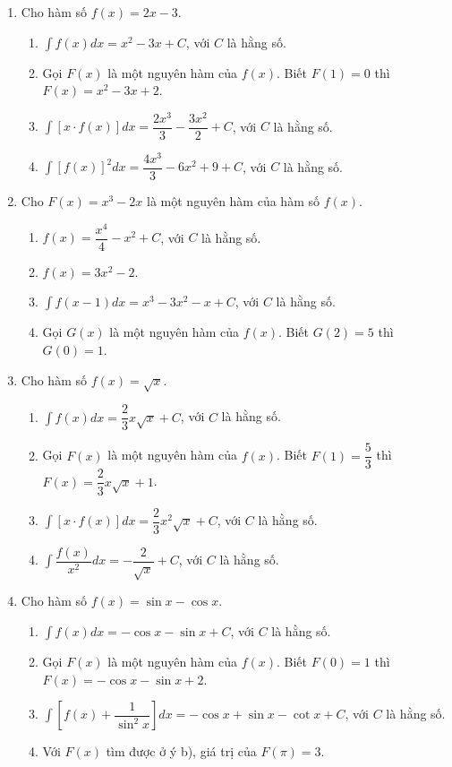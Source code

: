 \documentclass[12pt]{article}
\begin{document}
\begin{enumerate}[label=\textbf{Câu \arabic*.}, start=1]
		\item Cho hàm số $f(x) = 2x - 3$.
		\begin{enumerate}[label=\alph*)]
			\item $\displaystyle \int f(x) dx = x^2 - 3x + C$, với $C$ là hằng số.
			\item Gọi $F(x)$ là một nguyên hàm của $f(x)$. Biết $F(1) = 0$ thì $F(x) = x^2 - 3x + 2$.
			\item $\displaystyle \int [x \cdot f(x)] dx = \dfrac{2x^3}{3} - \dfrac{3x^2}{2} + C$, với $C$ là hằng số.
			\item $\displaystyle \int [f(x)]^2 dx = \dfrac{4x^3}{3} - 6x^2 + 9 + C$, với $C$ là hằng số.
		\end{enumerate}
		
		\item Cho $F(x) = x^3 - 2x$ là một nguyên hàm của hàm số $f(x)$.
		\begin{enumerate}[label=\alph*)]
			\item $f(x) = \dfrac{x^4}{4} - x^2 + C$, với $C$ là hằng số.
			\item $f(x) = 3x^2 - 2$.
			\item $\displaystyle \int f(x-1) dx = x^3 - 3x^2 - x + C$, với $C$ là hằng số.
			\item Gọi $G(x)$ là một nguyên hàm của $f(x)$. Biết $G(2) = 5$ thì $G(0) = 1$.
		\end{enumerate}
		
		\item Cho hàm số $f(x) = \sqrt{x}$.
		\begin{enumerate}[label=\alph*)]
			\item $\displaystyle \int f(x) dx = \dfrac{2}{3}x\sqrt{x} + C$, với $C$ là hằng số.
			\item Gọi $F(x)$ là một nguyên hàm của $f(x)$. Biết $F(1) = \dfrac{5}{3}$ thì $F(x) = \dfrac{2}{3}x\sqrt{x} + 1$.
			\item $\displaystyle \int [x \cdot f(x)] dx = \dfrac{2}{3}x^2\sqrt{x} + C$, với $C$ là hằng số.
			\item $\displaystyle \int \dfrac{f(x)}{x^2} dx = -\dfrac{2}{\sqrt{x}} + C$, với $C$ là hằng số.
		\end{enumerate}
		
		\item Cho hàm số $f(x) = \sin x - \cos x$.
		\begin{enumerate}[label=\alph*)]
			\item $\displaystyle \int f(x) dx = -\cos x - \sin x + C$, với $C$ là hằng số.
			\item Gọi $F(x)$ là một nguyên hàm của $f(x)$. Biết $F(0) = 1$ thì $F(x) = -\cos x - \sin x + 2$.
			\item $\displaystyle \int \left[ f(x) + \dfrac{1}{\sin^2 x} \right] dx = -\cos x + \sin x - \cot x + C$, với $C$ là hằng số.
			\item Với $F(x)$ tìm được ở ý b), giá trị của $F(\pi) = 3$.
		\end{enumerate}
		

\end{enumerate}
\end{document}
